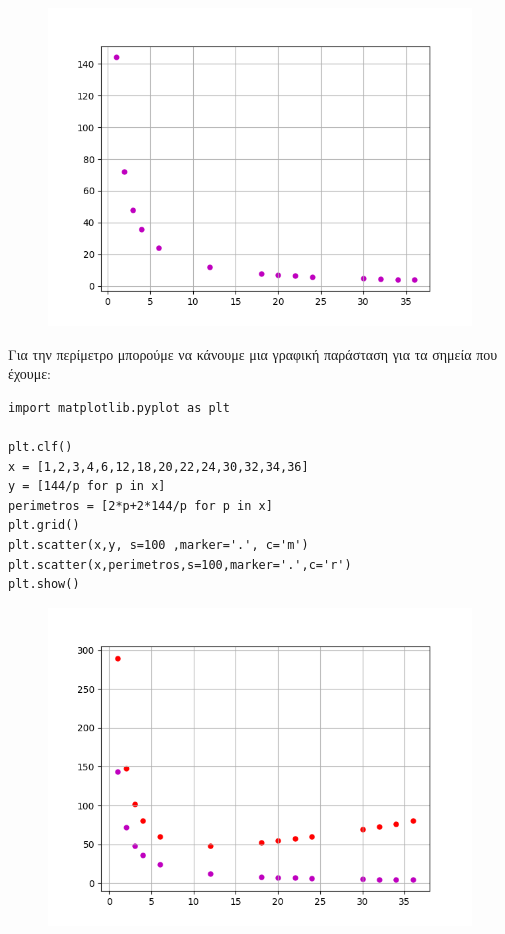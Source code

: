 \begin{figure}
\includegraphics{graph6.png}
\end{figure}
Για την περίμετρο μπορούμε να κάνουμε μια γραφική παράσταση για τα σημεία που έχουμε:
\begin{lstlisting}
import matplotlib.pyplot as plt

plt.clf()
x = [1,2,3,4,6,12,18,20,22,24,30,32,34,36]
y = [144/p for p in x]
perimetros = [2*p+2*144/p for p in x]
plt.grid()
plt.scatter(x,y, s=100 ,marker='.', c='m')
plt.scatter(x,perimetros,s=100,marker='.',c='r')
plt.show()
\end{lstlisting}
\begin{figure}
\includegraphics{graph7.png}
\end{figure}

